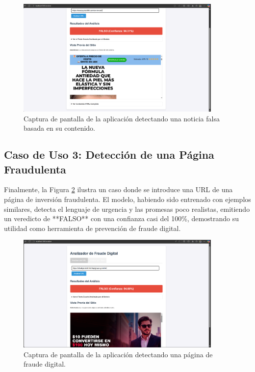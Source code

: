 \begin{figure}[htbp]
    \centering
    \includegraphics[width=0.9\textwidth]{Imagenes/app_falsa1.png} %
    \caption{Captura de pantalla de la aplicación detectando una noticia falsa basada en su contenido.}
    \label{fig:app_falsa1}
\end{figure}

\subsection{Caso de Uso 3: Detección de una Página Fraudulenta}
Finalmente, la Figura \ref{fig:app_falsa2} ilustra un caso donde se introduce una URL de una página de inversión fraudulenta. El modelo, habiendo sido entrenado con ejemplos similares, detecta el lenguaje de urgencia y las promesas poco realistas, emitiendo un veredicto de **FALSO** con una confianza casi del 100\%, demostrando su utilidad como herramienta de prevención de fraude digital.

\begin{figure}[htbp]
    \centering
    \includegraphics[width=0.9\textwidth]{Imagenes/app_falsa2.png} %
    \caption{Captura de pantalla de la aplicación detectando una página de fraude digital.}
    \label{fig:app_falsa2}
\end{figure}